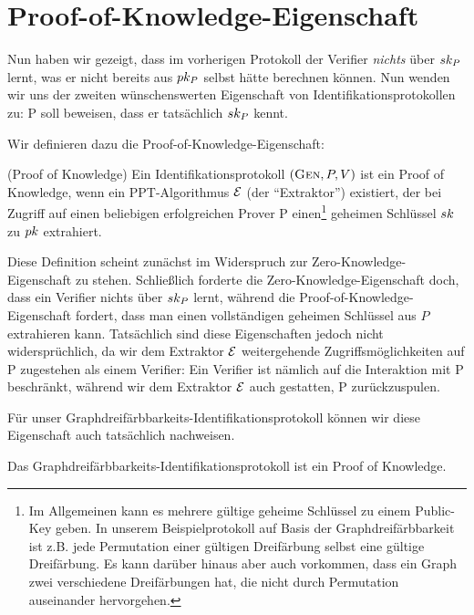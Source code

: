 \section{Proof-of-Knowledge-Eigenschaft}
Nun haben wir gezeigt, dass im vorherigen Protokoll der Verifier
\emph{nichts} über $sk_P$ lernt, was er nicht bereits aus $pk_P$
selbst hätte berechnen können.  Nun wenden wir uns der zweiten
wünschenswerten Eigenschaft von Identifikationsprotokollen zu: P soll
beweisen, dass er tatsächlich $sk_P$ kennt.

Wir definieren dazu die Proof-of-Knowledge-Eigenschaft:
\begin{definition}(Proof of Knowledge)
  Ein Identifikationsprotokoll $(\textsc{Gen}, P, V)$ ist ein Proof of
  Knowledge, wenn ein PPT-Algorithmus $\mathcal{E}$ (der "`Extraktor"')
  existiert, der bei Zugriff auf einen beliebigen erfolgreichen Prover P
  einen\footnote{Im Allgemeinen kann es mehrere gültige geheime Schlüssel
    zu einem Public-Key geben. In unserem Beispielprotokoll auf Basis der
    Graphdreifärbbarkeit ist z.B. jede Permutation einer gültigen
    Dreifärbung selbst eine gültige Dreifärbung. Es kann darüber hinaus aber
    auch vorkommen, dass ein Graph zwei verschiedene Dreifärbungen hat, die
    nicht durch Permutation auseinander hervorgehen.}  geheimen Schlüssel
  $sk$ zu $pk$ extrahiert.
\end{definition}

Diese Definition scheint zunächst im Widerspruch zur
Zero-Knowledge-Eigenschaft zu stehen.  Schließlich forderte die
Zero-Knowledge-Eigenschaft doch, dass ein Verifier nichts über $sk_P$
lernt, während die Proof-of-Knowledge-Eigenschaft fordert, dass man
einen vollständigen geheimen Schlüssel aus $P$ extrahieren kann.
Tatsächlich sind diese Eigenschaften jedoch nicht widersprüchlich, da
wir dem Extraktor $\mathcal{E}$ weitergehende Zugriffsmöglichkeiten auf P
zugestehen als einem Verifier: Ein Verifier ist nämlich auf die
Interaktion mit P beschränkt, während wir dem Extraktor $\mathcal{E}$ auch
gestatten, P zurückzuspulen.

Für unser Graphdreifärbbarkeits-Identifikationsprotokoll können wir
diese Eigenschaft auch tatsächlich nachweisen.

\begin{theorem}
  Das Graphdreifärbbarkeits-Identifikationsprotokoll ist ein Proof of Knowledge.
\end{theorem}

